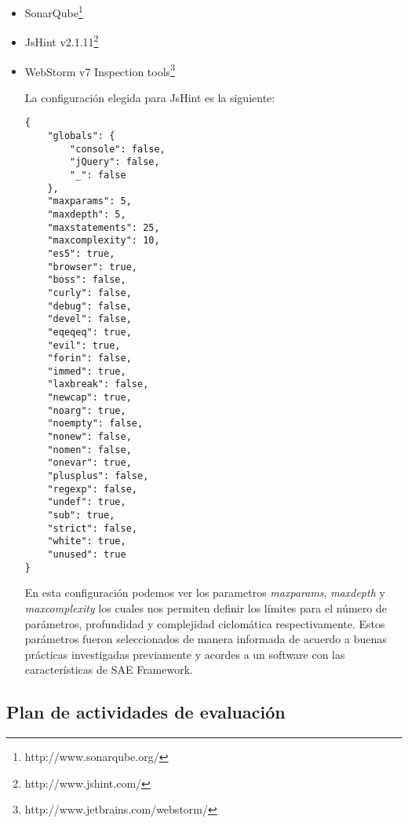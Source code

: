 \begin{itemize}
\item SonarQube\footnote{http://www.sonarqube.org/}
\item JsHint v2.1.11\footnote{http://www.jshint.com/}
\item WebStorm v7 Inspection tools\footnote{http://www.jetbrains.com/webstorm/}


La configuración elegida para JsHint es la siguiente:
\begin{verbatim}
{
    "globals": {
        "console": false,
        "jQuery": false,
        "_": false
    },
    "maxparams": 5,
    "maxdepth": 5,
    "maxstatements": 25,
    "maxcomplexity": 10,
    "es5": true,
    "browser": true,
    "boss": false,
    "curly": false,
    "debug": false,
    "devel": false,
    "eqeqeq": true,
    "evil": true,
    "forin": false,
    "immed": true,
    "laxbreak": false,
    "newcap": true,
    "noarg": true,
    "noempty": false,
    "nonew": false,
    "nomen": false,
    "onevar": true,
    "plusplus": false,
    "regexp": false,
    "undef": true,
    "sub": true,
    "strict": false,
    "white": true,
    "unused": true
}
\end{verbatim}

En esta configuración podemos ver los parametros \textit{maxparams}, \textit{maxdepth} 
y \textit{maxcomplexity} los cuales nos permiten definir los límites para el número de parámetros, 
profundidad y complejidad ciclomática respectivamente. Estos parámetros fueron seleccionados de manera 
informada de acuerdo a buenas prácticas investigadas previamente y acordes a un software con las 
características de SAE Framework.
\end{itemize}

\subsection{Plan de actividades de evaluación}

